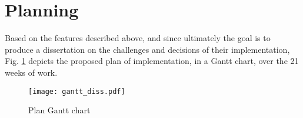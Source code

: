 \section{Planning}\label{sec:prob-planning}

Based on the features described above, and since ultimately the goal is to produce a dissertation on the challenges and decisions of their implementation, Fig. \ref{fig:gantt-plan} depicts the proposed plan of implementation, in a Gantt chart, over the 21 weeks of work.


\begin{landscape}
\begin{figure}
   \centering
    \texttt{[image: gantt\_diss.pdf]}
    \caption{Plan Gantt chart}
    \label{fig:gantt-plan}
\end{figure}
\end{landscape}




